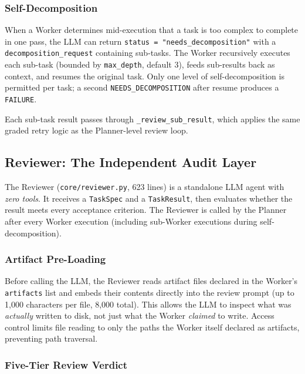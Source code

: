 \documentclass[11pt,a4paper]{article}
\begin{document}
\subsubsection*{Self-Decomposition}

When a Worker determines mid-execution that a task is too complex to complete
in one pass, the LLM can return \texttt{status = "needs\_decomposition"} with
a \texttt{decomposition\_request} containing sub-tasks. The Worker recursively
executes each sub-task (bounded by \texttt{max\_depth}, default 3), feeds
sub-results back as context, and resumes the original task. Only one level of
self-decomposition is permitted per task; a second
\texttt{NEEDS\_DECOMPOSITION} after resume produces a \texttt{FAILURE}.

Each sub-task result passes through \texttt{\_review\_sub\_result}, which
applies the same graded retry logic as the Planner-level review loop.

\subsection{Reviewer: The Independent Audit Layer}
\label{sec:reviewer}

The Reviewer (\texttt{core/reviewer.py}, 623 lines) is a standalone LLM agent
with \emph{zero tools}. It receives a \texttt{TaskSpec} and a
\texttt{TaskResult}, then evaluates whether the result meets every acceptance
criterion. The Reviewer is called by the Planner after every Worker execution
(including sub-Worker executions during self-decomposition).

\subsubsection*{Artifact Pre-Loading}

Before calling the LLM, the Reviewer reads artifact files declared in the
Worker's \texttt{artifacts} list and embeds their contents directly into the
review prompt (up to 1,000 characters per file, 8,000 total). This allows the
LLM to inspect what was \emph{actually} written to disk, not just what the
Worker \emph{claimed} to write. Access control limits file reading to only
the paths the Worker itself declared as artifacts, preventing path traversal.

\subsubsection*{Five-Tier Review Verdict}
\end{document}
